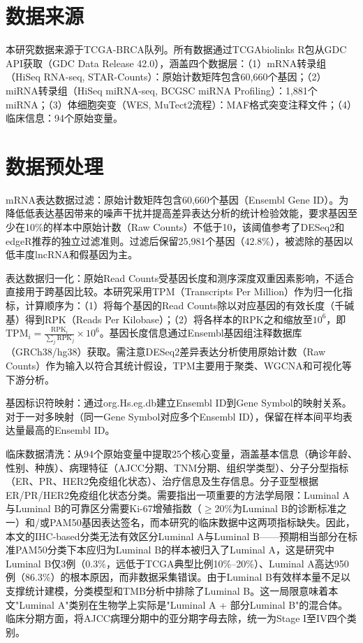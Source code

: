 \documentclass[12pt,a4paper,openany]{ctexbook}
\begin{document}
\section{数据来源}
本研究数据来源于TCGA-BRCA队列。所有数据通过TCGAbiolinks R包\cite{colaprico2016tcgabiolinks}从GDC API获取（GDC Data Release 42.0），涵盖四个数据层：（1）mRNA转录组（HiSeq RNA-seq, STAR-Counts）：原始计数矩阵包含60,660个基因；（2）miRNA转录组（HiSeq miRNA-seq, BCGSC miRNA Profiling）：1,881个miRNA；（3）体细胞突变（WES, MuTect2流程）：MAF格式突变注释文件；（4）临床信息：94个原始变量。

\section{数据预处理}
mRNA表达数据过滤：原始计数矩阵包含60,660个基因（Ensembl Gene ID）。为降低低表达基因带来的噪声干扰并提高差异表达分析的统计检验效能，要求基因至少在10\%的样本中原始计数（Raw Counts）不低于10，该阈值参考了DESeq2和edgeR推荐的独立过滤准则。过滤后保留25,981个基因（42.8\%），被滤除的基因以低丰度lncRNA和假基因为主。

表达数据归一化：原始Read Counts受基因长度和测序深度双重因素影响，不适合直接用于跨基因比较。本研究采用TPM（Transcripts Per Million）作为归一化指标，计算顺序为：（1）将每个基因的Read Counts除以对应基因的有效长度（千碱基）得到RPK（Reads Per Kilobase）；（2）将各样本的RPK之和缩放至$10^6$，即$\text{TPM}_i = \frac{\text{RPK}_i}{\sum_j \text{RPK}_j} \times 10^6$。基因长度信息通过Ensembl基因组注释数据库（GRCh38/hg38）获取。需注意DESeq2差异表达分析使用原始计数（Raw Counts）作为输入以符合其统计假设，TPM主要用于聚类、WGCNA和可视化等下游分析。

基因标识符映射：通过org.Hs.eg.db建立Ensembl ID到Gene Symbol的映射关系。对于一对多映射（同一Gene Symbol对应多个Ensembl ID），保留在样本间平均表达量最高的Ensembl ID。

临床数据清洗：从94个原始变量中提取25个核心变量，涵盖基本信息（确诊年龄、性别、种族）、病理特征（AJCC分期、TNM分期、组织学类型）、分子分型指标（ER、PR、HER2免疫组化状态）、治疗信息及生存信息。分子亚型根据ER/PR/HER2免疫组化状态分类。需要指出一项重要的方法学局限：Luminal A与Luminal B的可靠区分需要Ki-67增殖指数（$\geq$20\%为Luminal B的诊断标准之一）和/或PAM50基因表达签名，而本研究的临床数据中这两项指标缺失。因此，本文的IHC-based分类无法有效区分Luminal A与Luminal B——预期相当部分在标准PAM50分类下本应归为Luminal B的样本被归入了Luminal A，这是研究中Luminal B仅3例（0.3\%，远低于TCGA典型比例10\%--20\%）、Luminal A高达950例（86.3\%）的根本原因，而非数据采集错误。由于Luminal B有效样本量不足以支撑统计建模，分类模型和TMB分析中排除了Luminal B。这一局限意味着本文"Luminal A"类别在生物学上实际是"Luminal A + 部分Luminal B"的混合体。临床分期方面，将AJCC病理分期中的亚分期字母去除，统一为Stage I至IV四个类别。
\end{document}
